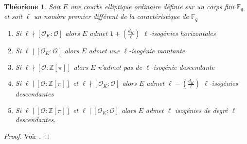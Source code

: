 \documentclass[10pt,a4paper]{book}
\theoremstyle{plain}
\newtheorem{thm}{Théorème}[chapter]
\theoremstyle{definition}
\theoremstyle{definition}
\theoremstyle{definition}
\theoremstyle{definition}
\theoremstyle{remark}
\theoremstyle{remark}
\theoremstyle{definition}
\begin{document}
\begin{thm}
\label{thm:Koh:cas}
Soit $E$ une courbe elliptique ordinaire définie sur un corps fini $\mathbb{F}_q$ et soit $\ell$ un nombre premier différent de la caractéristique de $\mathbb{F}_q$
\begin{enumerate}
\item Si $\ell \nmid [\mathcal{O}_K : \mathcal{O}]$ alors $E$ admet $ 1 + \left( \frac{d_K}{\ell} \right)$ $\ell$-isogénies horizontales
\item Si $\ell \mid [\mathcal{O}_K : \mathcal{O}]$ alors $E$ admet une $\ell$-isogénie montante
\item Si $\ell \nmid [\mathcal{O} : \mathbb{Z}[\pi]]$ alors $E$ n'admet pas de $\ell$-isogénie descendante
\item Si $\ell \mid [\mathcal{O} : \mathbb{Z}[\pi]]$ et $\ell \nmid [\mathcal{O}_K : \mathcal{O}]$ alors $E$ admet $\ell-\left( \frac{d_K}{\ell} \right)$ $\ell$-isogénies descendantes
\item  Si $\ell \mid [\mathcal{O} : \mathbb{Z}[\pi]]$ et $\ell \mid [\mathcal{O}_K : \mathcal{O}]$ alors $E$ admet $\ell$ isogénies de degré $\ell$ descendantes.
\end{enumerate}
\end{thm}

\begin{proof}
Voir \cite[Proposition 23]{Kohel96}.
\end{proof}
\end{document}
